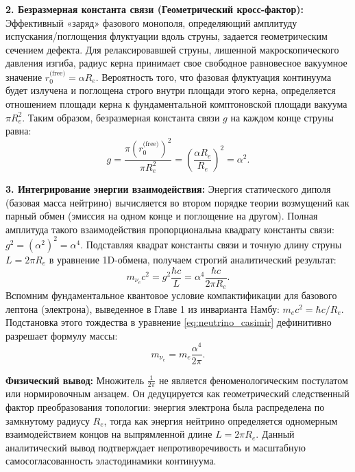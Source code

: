 \documentclass[11pt,a4paper]{article}
\begin{document}
	\textbf{2. Безразмерная константа связи (Геометрический кросс-фактор):}
	Эффективный «заряд» фазового монополя, определяющий амплитуду испускания/поглощения флуктуации вдоль струны, задается геометрическим сечением дефекта. 
	Для релаксировавшей струны, лишенной макроскопического давления изгиба, радиус керна принимает свое свободное равновесное вакуумное значение $r_0^{\text{(free)}} = \alpha R_e$. 
	Вероятность того, что фазовая флуктуация континуума будет излучена и поглощена строго внутри площади этого керна, определяется отношением площади керна к фундаментальной комптоновской площади вакуума $\pi R_e^2$. Таким образом, безразмерная константа связи $g$ на каждом конце струны равна:
	\begin{equation}
		g = \frac{\pi (r_0^{\text{(free)}})^2}{\pi R_e^2} = \left( \frac{\alpha R_e}{R_e} \right)^2 = \alpha^2.
	\end{equation}
	
	\textbf{3. Интегрирование энергии взаимодействия:}
	Энергия статического диполя (базовая масса нейтрино) вычисляется во втором порядке теории возмущений как парный обмен (эмиссия на одном конце и поглощение на другом). Полная амплитуда такого взаимодействия пропорциональна квадрату константы связи: $g^2 = (\alpha^2)^2 = \alpha^4$.
	Подставляя квадрат константы связи и точную длину струны $L = 2\pi R_e$ в уравнение 1D-обмена, получаем строгий аналитический результат:
	\begin{equation}
		m_{\nu_e} c^2 = g^2 \frac{\hbar c}{L} = \alpha^4 \frac{\hbar c}{2\pi R_e}.
		\label{eq:neutrino_casimir}
	\end{equation}
	Вспомним фундаментальное квантовое условие компактификации для базового лептона (электрона), выведенное в Главе 1 из инварианта Намбу: $m_e c^2 = \hbar c / R_e$. Подстановка этого тождества в уравнение \eqref{eq:neutrino_casimir} дефинитивно разрешает формулу массы:
	\begin{equation}
		m_{\nu_e} = m_e \frac{\alpha^4}{2\pi}.
	\end{equation}
	
	\textbf{Физический вывод:} Множитель $\frac{1}{2\pi}$ не является феноменологическим постулатом или нормировочным анзацем. Он дедуцируется как геометрический следственный фактор преобразования топологии: энергия электрона была распределена по замкнутому радиусу $R_e$, тогда как энергия нейтрино определяется одномерным взаимодействием концов на выпрямленной длине $L = 2\pi R_e$. Данный аналитический вывод подтверждает непротиворечивость и масштабную самосогласованность эластодинамики континуума.
	
\end{document}
